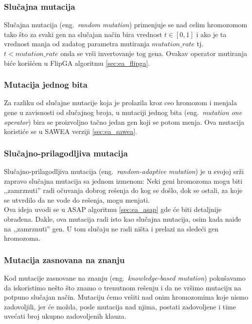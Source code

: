 \documentclass[a4paper]{article}
\begin{document}
\subsubsection{Slučajna mutacija}
\label{sec:ea_slucajna_mutacija}
Slučajna mutacija (eng.~{\em random mutation}) primenjuje se nad celim hromozomom 
tako što za svaki gen na slučajan način bira vrednost $t \in [0,1]$ 
i ako je ta vrednost manja od zadatog parametra mutiranja $mutation\_rate$ 
tj. $ t < mutation\_rate$ onda se vrši invertovanje tog gena.
Ovakav operator mutiranja biće korišćen u FlipGA algoritmu \ref{sec:ea_flipga}.

\subsubsection{Mutacija jednog bita}
\label{sec:ea_mutacija_one}
Za razliku od slučajne mutacije koja je prolazila kroz ceo hromozom i menjala gene u
zavisnosti od slučajnog broja, u mutaciji jednog bita (eng.~{\em mutation one operator})
bira se proizvoljno tačno jedan gen koji se potom menja. 
Ova mutacija koristiće se u SAWEA verziji \ref{sec:ea_sawea}.

\subsubsection{Slučajno-prilagodljiva mutacija}
\label{sec:ea_slucajno_prilagodljiva_mutacija}
Slučajno-prilagodljiva mutacija (eng.~{\em random-adaptive mutation}) \cite{adaptiveEA} 
je u svojoj srži zapravo slučajna mutacija sa jednom izmenom:
Neki geni hromozoma mogu biti ,,zamrznuti'' radi očuvanja dobrog rešenja do kog se došlo,
dok se ostali, za koje se utvrdilo da ne vode do rešenja, mogu menjati.\\

Ova ideja uvodi se u ASAP algoritmu \ref{sec:ea_asap} gde će biti detaljnije obrađena.
Dakle, ova mutacija radi isto kao slučajna mutacija, osim kada naiđe na ,,zamrznuti'' gen.
U tom slučaju ne radi ništa i prelazi na sledeći gen hromozoma.

\subsubsection{Mutacija zasnovana na znanju}
\label{sec:ea_mutacija_znanje}
Kod mutacije zasnovane na znanju (eng.~{\em knowledge-based mutation}) \cite{ea_with_table}
pokušavamo da iskoristimo nešto što znamo o trenutnom rešenju
i da ne vršimo mutaciju na potpuno slučajan način.
Mutaciju ćemo vršiti nad onim hromozomima koje nismo zadovoljili, 
jer će možda, posle mutacija nad njima, postati zadovoljene i time uvećati broj ukupno
zadovoljenih klauza.\\
\end{document}
